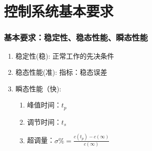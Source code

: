\documentclass{beamer}
\begin{document}
\section{控制系统基本要求}
\label{sec-2}
\begin{frame}
\frametitle{基本要求：稳定性、稳态性能、瞬态性能}
\label{sec-2-1}

\begin{enumerate}
\item <2->稳定性(稳): 正常工作的先决条件
\item <3->稳态性能(准): 指标：稳态误差
\item <4->瞬态性能（快):
\begin{enumerate}
\item <5->峰值时间：$t_p$
\item <6->调节时间：$t_s$
\item <7->超调量：$\sigma \% = \frac{c(t_p)-c(\infty)}{c(\infty)}$
\end{enumerate}
\end{enumerate}
\end{frame}
\end{document}
